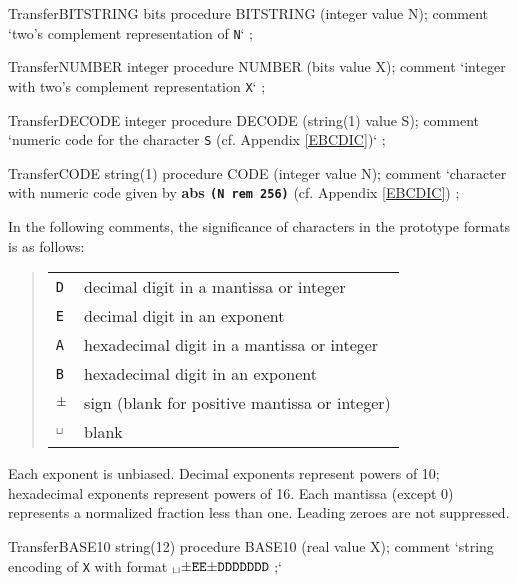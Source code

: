 \documentclass[a4paper]{article}
\begin{document}
\begin{ProcedureDeclaration}{Transfer}{BITSTRING}
bits procedure BITSTRING  (integer value N);
comment `\rm two's complement representation of {\tt N}` ;
\end{ProcedureDeclaration}

\begin{ProcedureDeclaration}{Transfer}{NUMBER}
integer procedure NUMBER (bits value X);
comment `\rm integer with two's complement representation {\tt X}` ;
\end{ProcedureDeclaration}

\label{DECODE}
\begin{ProcedureDeclaration}{Transfer}{DECODE}
integer procedure DECODE (string(1) value S);
comment `\rm numeric code for the character {\tt S} (cf. Appendix \ref{EBCDIC})` ;
\end{ProcedureDeclaration}

\begin{ProcedureDeclaration}{Transfer}{CODE}
string(1) procedure  CODE (integer value N);
comment `\rm character with numeric code given by {\bf abs \tt (N \bf rem \tt 256)} (cf. Appendix \ref{EBCDIC}) ;
\end{ProcedureDeclaration}

In the following comments, the significance of characters in the prototype
formats is as follows:
\begin{quote}
\begin{tabular}[t]{lp{\linewidth}}
{\tt D} & decimal digit in a mantissa or integer \\
{\tt E} & decimal digit in an exponent \\
{\tt A} & hexadecimal digit in a mantissa or integer \\
{\tt B} & hexadecimal digit in an exponent \\
${\tt{\pm}}$ & sign (blank for positive mantissa or integer) \\
${\tt{_\sqcup}}$  & blank
\end{tabular}
\end{quote}
Each exponent is unbiased. Decimal exponents represent powers of 10;
hexadecimal exponents represent powers of 16. Each mantissa (except 0)
represents a normalized fraction less than one. Leading zeroes are not
suppressed.

\begin{ProcedureDeclaration}{Transfer}{BASE10}
string(12) procedure BASE10 (real value X);
comment `\rm string encoding of {\tt X} with format ${\tt{_\sqcup}{\pm}EE{\pm}DDDDDDD}$ ;`
\end{ProcedureDeclaration}
\end{document}
